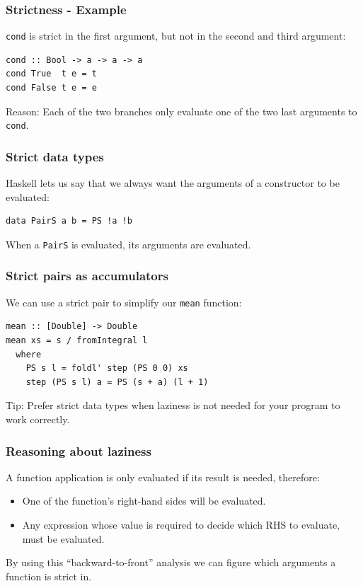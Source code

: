 \documentclass{beamer}
\begin{document}
\begin{frame}[fragile]
  \frametitle{Strictness - Example}

  \lstinline!cond! is strict in the first argument, but not in the
  second and third argument:
  \begin{lstlisting}
cond :: Bool -> a -> a -> a
cond True  t e = t
cond False t e = e
  \end{lstlisting}
  Reason: Each of the two branches only evaluate one of the two last
  arguments to \lstinline!cond!.
\end{frame}

\begin{frame}[fragile]
  \frametitle{Strict data types}

  Haskell lets us say that we always want the arguments of a
  constructor to be evaluated:

\begin{lstlisting}
data PairS a b = PS !a !b
\end{lstlisting}

  When a \lstinline!PairS! is evaluated, its arguments are evaluated.
\end{frame}

\begin{frame}[fragile]
  \frametitle{Strict pairs as accumulators}

  We can use a strict pair to simplify our \lstinline!mean! function:

  \begin{lstlisting}
mean :: [Double] -> Double
mean xs = s / fromIntegral l
  where
    PS s l = foldl' step (PS 0 0) xs
    step (PS s l) a = PS (s + a) (l + 1)
  \end{lstlisting}

  Tip: Prefer strict data types when laziness is not needed for your
  program to work correctly.

\end{frame}

\begin{frame}[fragile]
  \frametitle{Reasoning about laziness}

  A function application is only evaluated if its result is needed,
  therefore:
  \begin{itemize}
  \item One of the function's right-hand sides will be evaluated.
  \item Any expression whose value is required to decide which RHS to
    evaluate, must be evaluated.
  \end{itemize}
  By using this ``backward-to-front'' analysis we can figure which
  arguments a function is strict in.
\end{frame}
\end{document}
